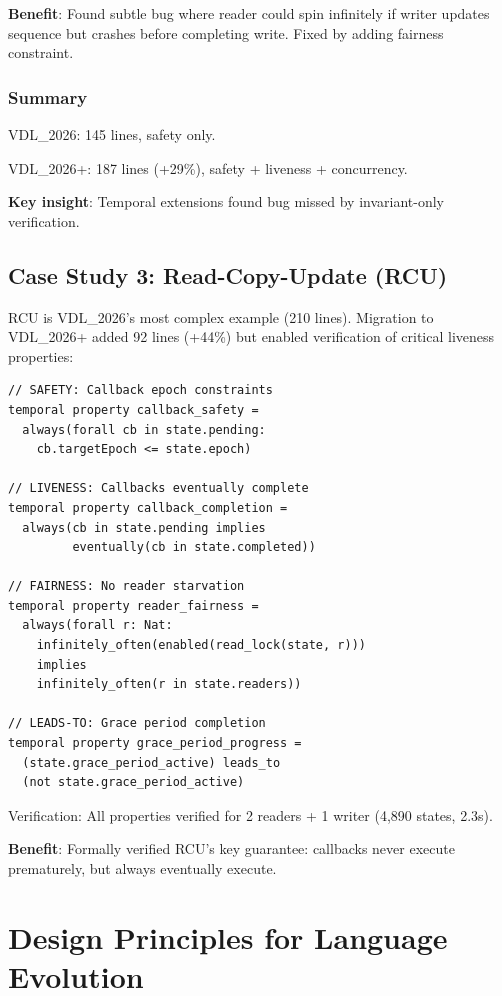 \documentclass[conference]{IEEEtran}
\begin{document}
\textbf{Benefit}: Found subtle bug where reader could spin infinitely if writer updates sequence but crashes before completing write. Fixed by adding fairness constraint.

\subsubsection{Summary}

VDL\_2026: 145 lines, safety only.

VDL\_2026+: 187 lines (+29\%), safety + liveness + concurrency.

\textbf{Key insight}: Temporal extensions found bug missed by invariant-only verification.

\subsection{Case Study 3: Read-Copy-Update (RCU)}

RCU is VDL\_2026's most complex example (210 lines). Migration to VDL\_2026+ added 92 lines (+44\%) but enabled verification of critical liveness properties:

\begin{lstlisting}[caption={RCU temporal properties}]
// SAFETY: Callback epoch constraints
temporal property callback_safety =
  always(forall cb in state.pending:
    cb.targetEpoch <= state.epoch)

// LIVENESS: Callbacks eventually complete
temporal property callback_completion =
  always(cb in state.pending implies
         eventually(cb in state.completed))

// FAIRNESS: No reader starvation
temporal property reader_fairness =
  always(forall r: Nat:
    infinitely_often(enabled(read_lock(state, r)))
    implies
    infinitely_often(r in state.readers))

// LEADS-TO: Grace period completion
temporal property grace_period_progress =
  (state.grace_period_active) leads_to
  (not state.grace_period_active)
\end{lstlisting}

Verification: All properties verified for 2 readers + 1 writer (4,890 states, 2.3s).

\textbf{Benefit}: Formally verified RCU's key guarantee: callbacks never execute prematurely, but always eventually execute.

\section{Design Principles for Language Evolution}
\label{sec:principles}
\end{document}
